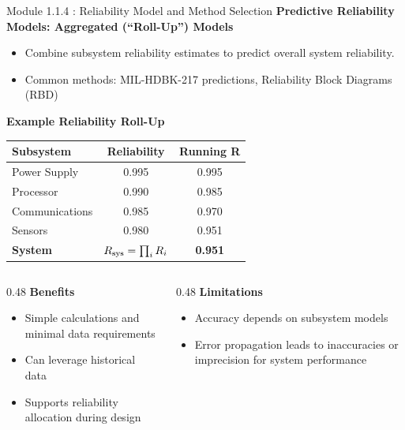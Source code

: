 \documentclass{beamer}
\begin{document}
\begin{frame}{Module 1.1.4 : Reliability Model and Method Selection}
\scriptsize
\textbf{Predictive Reliability Models: Aggregated (``Roll-Up'') Models}
\begin{itemize}
\scriptsize
\item Combine subsystem reliability estimates to predict overall system reliability.
\item Common methods: MIL-HDBK-217 predictions, Reliability Block Diagrams (RBD)
\end{itemize}
\textbf{Example Reliability Roll-Up}
\begin{center}
\begin{tabular}{|l|c|c|}
\hline
\textbf{Subsystem} & \textbf{Reliability} & \textbf{Running R} \\
\hline
Power Supply & 0.995 & 0.995\\
Processor    & 0.990 & 0.985 \\
Communications & 0.985 & 0.970 \\
Sensors      & 0.980 & 0.951 \\ \hline
\textbf{System} & $R_{\rm sys}=\prod_i R_i$ & \textbf{0.951} \\
\hline
\end{tabular}
\end{center}
\vspace{0.25cm}
\begin{columns}[T]
\begin{column}{0.48\textwidth}
\textbf{Benefits}
\begin{itemize}
\item Simple calculations and minimal data requirements
\item Can leverage historical data
\item Supports reliability allocation during design
\end{itemize}
\end{column}
\begin{column}{0.48\textwidth}
\textbf{Limitations}
\begin{itemize}
    \item Accuracy depends on subsystem models
    \item Error propagation leads to inaccuracies or imprecision for system performance
\end{itemize}
\end{column}
\end{columns}
\end{frame}
\end{document}
